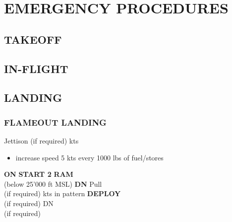 \chapter{EMERGENCY PROCEDURES}
\localtableofcontents
\thispagestyle{plain}
\cleardoublepage

\marginfigeometry

\section{TAKEOFF}

\section{IN-FLIGHT}

\clearpage

\section{LANDING}

\subsection{FLAMEOUT LANDING}

\begin{checklistenumerate}
    \blueitem[Stores]\dotfill Jettison (if required)
    \blueitem[Airspeed] kts
    \begin{itemize}
        \item increase speed 5 kts every 1000 lbs of fuel/stores
    \end{itemize}
    \blueitem[EPU]\dotfill \textbf{ON}
    \dotfill \textbf{START 2}
    \dotfill \textbf{RAM}\\
    \hfill(below 25'000 ft MSL)
    \blueitem[LG Handle]\dotfill \textbf{DN}
    \dotfill Pull\\
    \hfill(if required)
    \blueitem[Airspeed] kts in pattern
    \dotfill \textbf{DEPLOY}\\
    \hfill(if required)
    \dotfill DN\\
    \hfill(if required)
\end{checklistenumerate}

\clearpage

